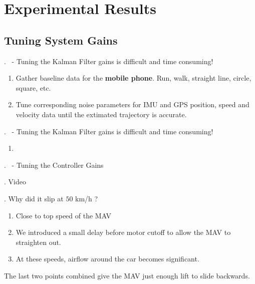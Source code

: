 \section{Experimental Results}

\subsection{Tuning System Gains}
\begin{frame}{\thesection. \insertsection \ - \insertsubsection}
	Tuning the Kalman Filter gains is difficult and time consuming!
	\begin{enumerate}
		\item Gather baseline data for the \textbf{mobile phone}. Run, walk, straight line,
		circle, square, etc.
		\item Tune corresponding noise parameters for IMU and GPS position, speed and velocity data
		until the extimated trajectory is accurate.
	\end{enumerate}
\end{frame}


\begin{frame}{\thesection. \insertsection \ - \insertsubsection}
	Tuning the Kalman Filter gains is difficult and time consuming!
	\begin{enumerate}
		\item 
	\end{enumerate}
\end{frame}


\begin{frame}{\thesection. \insertsection \ - \insertsubsection}
	Tuning the Controller Gains
\end{frame}


\begin{frame}{\thesection. \insertsection}
	Video
\end{frame}


\begin{frame}{\thesection. \insertsection}	
	Why did it slip at $50$ km/h ?
	\begin{enumerate}
		\item Close to top speed of the MAV 
		\item We introduced a small delay before motor cutoff to allow the MAV to straighten out.
		\item At these speeds, airflow around the car becomes significant.
	\end{enumerate}
	The last two points combined give the MAV just enough lift to slide backwards.
\end{frame}